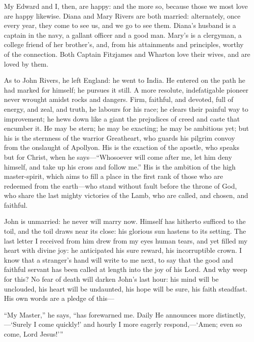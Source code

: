 My Edward and I, then, are happy: and the more so, because those we most
love are happy likewise. Diana and Mary Rivers are both married:
alternately, once every year, they come to see us, and we go to see
them. Diana's husband is a captain in the navy, a gallant officer and a
good man. Mary's is a clergyman, a college friend of her brother's,
and, from his attainments and principles, worthy of the connection. 
Both Captain Fitzjames and \Mr{} Wharton love their wives, and are loved
by them.

As to \St{} John Rivers, he left England: he went to India. He entered on
the path he had marked for himself; he pursues it still. A more
resolute, indefatigable pioneer never wrought amidst rocks and dangers. 
Firm, faithful, and devoted, full of energy, and zeal, and truth, he
labours for his race; he clears their painful way to improvement; he
hews down like a giant the prejudices of creed and caste that encumber
it. He may be stern; he may be exacting; he may be ambitious yet; but
his is the sternness of the warrior Greatheart, who guards his pilgrim
convoy from the onslaught of Apollyon. His is the exaction of the
apostle, who speaks but for Christ, when he says---\enquote{Whosoever
will come after me, let him deny himself, and take up his cross and
follow me.} His is the ambition of the high master-spirit, which aims
to fill a place in the first rank of those who are redeemed from the
earth---who stand without fault before the throne of God, who share the
last mighty victories of the Lamb, who are called, and chosen, and
faithful.

\St{} John is unmarried: he never will marry now. Himself has hitherto
sufficed to the toil, and the toil draws near its close: his glorious
sun hastens to its setting. The last letter I received from him drew
from my eyes human tears, and yet filled my heart with divine joy: he
anticipated his sure reward, his incorruptible crown. I know that a
stranger's hand will write to me next, to say that the good and faithful
servant has been called at length into the joy of his Lord. And why
weep for this? No fear of death will darken \St{} John's last hour: his
mind will be unclouded, his heart will be undaunted, his hope will be
sure, his faith steadfast. His own words are a pledge of this---

\enquote{My Master,} he says, \enquote{has forewarned me. Daily He
announces more distinctly,---\enquote{Surely I come quickly!} and hourly I more
eagerly respond,---\enquote{Amen; even so come, Lord Jesus!}}
